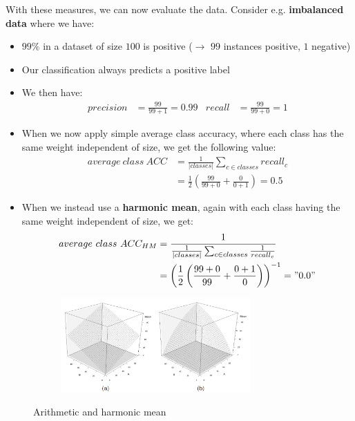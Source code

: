 With these measures, we can now evaluate the data. Consider e.g. \textbf{imbalanced data} where we have:
\begin{itemize}
  \item $99\%$ in a dataset of size $100$ is positive ($\rightarrow$ $99$ instances positive, $1$ negative)
  \item Our classification always predicts a positive label
  \item We then have:
  \begin{align*}
    precision &= \frac{99}{99+1} = 0.99& recall&=\frac{99}{99+0} = 1
  \end{align*}
  \item When we now apply simple average class accuracy, where each class has the same weight independent of size, we get the following value:
  \begin{align*}
    average\ class\ ACC & = \frac{1}{|classes|}\sum_{c\in classes} recall_c\\
    &= \frac{1}{2}\left(\frac{99}{99+0} + \frac{0}{0+1}\right)  = 0.5
  \end{align*}
  \item When we instead use a \textbf{harmonic mean}, again with each class having the same weight independent of size, we get:
  \begin{align*}
    average\ class\ ACC_{HM} & = \frac{1}{\frac{1}{|classes|}\sum_{c\in classes} \frac{1}{recall_c}}\\
    &= \left(\frac{1}{2}\left(\frac{99+0}{99} + \frac{0+1}{0}\right)\right)^{-1}  = "0.0"
  \end{align*}
\end{itemize}

\begin{figure}[H]
  \centering
  \begin{subfigure}{0.8\textwidth}
    \centering
    \includegraphics[width=0.8\textwidth]{assets/sl/ct__harmonic_mean.png}

  \end{subfigure}

  \caption{Arithmetic and harmonic mean}
  \label{fig:7_ct_harmonic_mean}
\end{figure}

